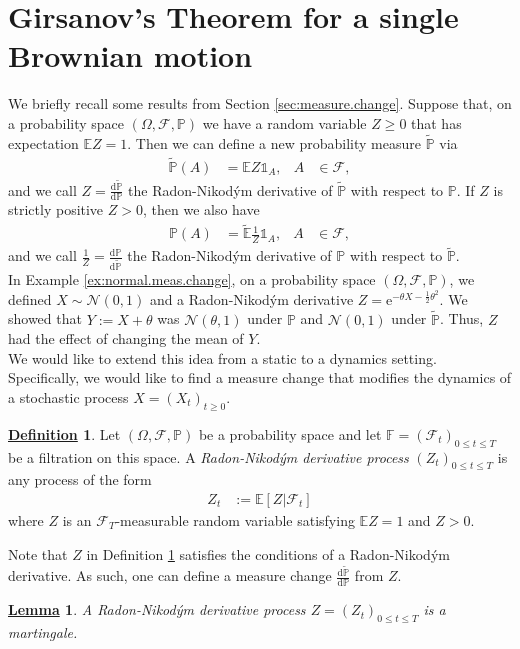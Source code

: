 \documentclass[12pt]{book}
\numberwithin{equation}{chapter}
\theoremstyle{plain}
\numberwithin{theorem}{section}
\newtheorem{lemma}[theorem]{\underline{Lemma}}   		%
\theoremstyle{definition}
\newtheorem{definition}[theorem]{\underline{Definition}}
\numberwithin{exercise}{chapter}
\newcommand{\<}{\langle}
\renewcommand{\>}{\rangle}
\renewcommand{\(}{\left(}
\renewcommand{\)}{\right)}
\renewcommand{\[}{\left[}
\renewcommand{\]}{\right]}
\newcommand\Eb{\mathds{E}}
\newcommand\Fb{\mathds{F}}
\newcommand\Ib{\mathds{1}} 	%
\newcommand\Pb{\mathds{P}}
\newcommand\Fc{\mathscr{F}}
\newcommand\Nc{\mathscr{N}}
\newcommand\Om{\Omega}
\newcommand\Ebt{\widetilde{\Eb}}
\newcommand\Pbt{\widetilde{\Pb}}
\newcommand\dd{\mathrm{d}}
\newcommand\ee{\mathrm{e}}
\begin{document}
\section{Girsanov's Theorem for a single Brownian motion}
We briefly recall some results from Section \ref{sec:measure.change}.
Suppose that, on a probability space $(\Om,\Fc,\Pb)$ we have a random variable $Z \geq 0$ that has expectation $\Eb Z = 1$.
Then we can define a new probability measure $\Pbt$ via
\begin{align}
\Pbt(A)
	&=	\Eb Z \Ib_A , &
A
	&\in \Fc ,
\end{align}
and we call $Z=\frac{\dd \Pbt}{\dd \Pb}$ the Radon-Nikod\'ym derivative of $\Pbt$ with respect to $\Pb$.  If $Z$ is strictly positive $Z>0$, then we also have
\begin{align}
\Pb(A)
	&=	\Ebt \frac{1}{Z} \Ib_A , &
A
	&\in \Fc ,
\end{align}
and we call $\frac{1}{Z}=\frac{\dd \Pb}{\dd \Pbt}$ the Radon-Nikod\'ym derivative of $\Pb$ with respect to $\Pbt$.
\\[0.5em]
In Example \ref{ex:normal.meas.change}, on a probability space $(\Om,\Fc,\Pb)$, we defined $X \sim \Nc(0,1)$ and a Radon-Nikod\'ym derivative $Z = \ee^{- \theta X - \tfrac{1}{2} \theta^2}$.  We showed that $Y := X + \theta$ was $\Nc(\theta,1)$ under $\Pb$ and $\Nc(0,1)$ under $\Pbt$.  Thus, $Z$ had the effect of changing the mean of $Y$.
\\[0.5em]
We would like to extend this idea from a static to a dynamics setting.  Specifically, we would like to find a measure change that modifies the dynamics of a stochastic process $X = (X_t)_{t \geq 0}$.

\begin{definition}
\label{def:rndp}
Let $(\Om,\Fc,\Pb)$ be a probability space and let $\Fb=(\Fc_t)_{0 \leq t \leq T}$ be a filtration on this space.  A \emph{Radon-Nikod\'ym derivative process} $(Z_t)_{0 \leq t \leq T}$ is any process of the form
\begin{align}
Z_t
	&:=	\Eb[ Z | \Fc_t ]
\end{align}
where $Z$ is an $\Fc_T$-measurable random variable satisfying $\Eb Z = 1$ and $Z > 0$.
\end{definition}

\noindent
Note that $Z$ in Definition \ref{def:rndp} satisfies the conditions of a Radon-Nikod\'ym derivative.  As such, one can define a measure change $\frac{\dd \Pbt}{\dd \Pb}
$ from $Z$.

\begin{lemma}
A \emph{Radon-Nikod\'ym derivative process} $Z = (Z_t)_{0 \leq t \leq T}$ is a martingale.
\end{lemma}
\end{document}
